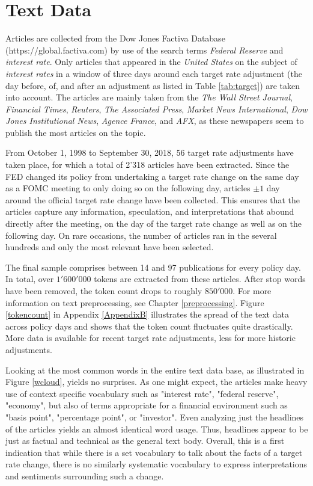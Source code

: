 \documentclass[11pt,a4paper,english,oneside]{book}
\numberwithin{equation}{chapter}
\begin{document}
\section{Text Data}\label{textdata}

Articles are collected from the Dow Jones Factiva Database (https://global.factiva.com) by use of the search terms \textit{Federal Reserve} and \textit{interest rate}. Only articles that appeared in the \textit{United States} on the subject of \textit{interest rates} in a window of three days around each target rate adjustment (the day before, of, and after an adjustment as listed in Table \ref{tab:target}) are taken into account. The articles are mainly taken from the \textit{The Wall Street Journal}, \textit{Financial Times}, \textit{Reuters}, \textit{The Associated Press}, \textit{Market News International}, \textit{Dow Jones Institutional News}, \textit{Agence France}, and \textit{AFX}, as these newspapers seem to publish the most articles on the topic. 

From October 1, 1998 to September 30, 2018, 56 target rate adjustments have taken place, for which a total of 2'318 articles have been extracted. Since the FED changed its policy from undertaking a target rate change on the same day as a FOMC meeting to only doing so on the following day, articles $\pm1$ day around the official target rate change have been collected. This ensures that the articles capture any information, speculation, and interpretations that abound directly after the meeting, on the day of the target rate change as well as on the following day. On rare occasions, the number of articles ran in the several hundreds and only the most relevant have been selected. 

The final sample comprises between 14 and 97 publications for every policy day. In total, over $1'600'000$ tokens are extracted from these articles. After stop words have been removed, the token count drops to roughly $850'000$. For more information on text preprocessing, see Chapter \ref{preprocessing}. Figure \ref{tokencount} in Appendix \ref{AppendixB} illustrates the spread of the text data across policy days and shows that the token count fluctuates quite drastically. More data is available for recent target rate adjustments, less for more historic adjustments.

Looking at the most common words in the entire text data base, as illustrated in Figure \ref{wcloud}, yields no surprises. As one might expect, the articles make heavy use of context specific vocabulary such as "interest rate", "federal reserve", "economy", but also of terms appropriate for a financial environment such as "basis point", "percentage point", or "investor". Even analyzing just the headlines of the articles yields an almost identical word usage. Thus, headlines appear to be just as factual and technical as the general text body. Overall, this is a first indication that while there is a set vocabulary to talk about the facts of a target rate change, there is no similarly systematic vocabulary to express interpretations and sentiments surrounding such a change. 
\end{document}
